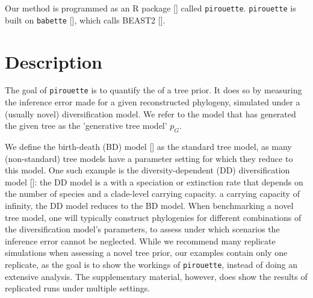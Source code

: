 Our method is programmed as an R package [\cite{R}] called \verb;pirouette;.
\verb;pirouette; is built on \verb;babette; [\cite{bilderbeek2018babette}], 
which calls BEAST2 [\cite{bouckaert2019beast}]. 

\section{Description}

The goal of \verb;pirouette; is to quantify the  of a tree prior.
It does so by measuring the inference error made 
for a given reconstructed phylogeny, 
simulated under a (usually novel) diversification model.
We refer to the model that has generated the given tree 
as the 'generative tree model' $\mathit{p_{G}}$.



We define the birth-death (BD) model [\cite{nee1994reconstructed}] as
the standard tree model, as many (non-standard) tree models 
have a parameter setting for which they reduce to this model. 
One such example is the diversity-dependent (DD) diversification 
model [\cite{DDD, etienne2012diversity}]:
the DD model is a  with a speciation 
or extinction rate that depends 
on the number of species and a clade-level carrying capacity.
 a carrying capacity
of infinity, the DD model reduces to the BD model.
When benchmarking a novel tree model, 
one will typically construct phylogenies 
for different combinations of the diversification model's parameters, 
to assess under which scenarios the inference error cannot be neglected. 
While we recommend many replicate simulations 
when assessing a novel tree prior, 
our examples contain only one replicate,
as the goal is to show the workings of \verb;pirouette;,
instead of doing an extensive analysis.
The supplementary material, however, does show the results
of replicated runs under multiple settings.

